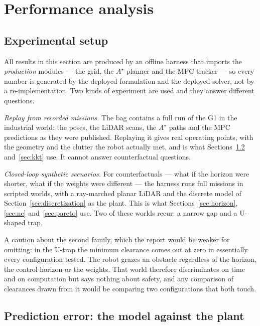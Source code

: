 \documentclass[11pt,a4paper]{article}
\newcommand{\astar}{$A^\star$}
\begin{document}
\section{Performance analysis}
\label{sec:performance}

\subsection{Experimental setup}
\label{sec:setup}

All results in this section are produced by an offline harness that imports the \emph{production} modules ---
the grid, the \astar{} planner and the MPC tracker --- so every number is generated by the deployed
formulation and the deployed solver, not by a re-implementation. Two kinds of experiment are used and they
answer different questions.

\emph{Replay from recorded missions.} The bag \resBag{} contains a full run of the G1 in the industrial world:
the poses, the LiDAR scans, the \astar{} paths and the MPC predictions as they were published. Replaying it
gives real operating points, with the geometry and the clutter the robot actually met, and is what
Sections~\ref{sec:prederr} and~\ref{sec:kkt} use. It cannot answer counterfactual questions.

\emph{Closed-loop synthetic scenarios.} For counterfactuals --- what if the horizon were shorter, what if the
weights were different --- the harness runs full missions in scripted worlds, with a ray-marched planar
LiDAR and the discrete model of Section~\ref{sec:discretization} as the plant. This is what
Sections~\ref{sec:horizon}, \ref{sec:nc} and~\ref{sec:pareto} use. Two of these worlds recur: a narrow gap
and a U-shaped trap.

A caution about the second family, which the report would be weaker for omitting: in the U-trap the minimum
clearance comes out at zero in essentially every configuration tested. The robot grazes an obstacle
regardless of the horizon, the control horizon or the weights. That world therefore discriminates on time and
on computation but says nothing about safety, and any comparison of clearances drawn from it would be
comparing two configurations that both touch.

\subsection{Prediction error: the model against the plant}
\label{sec:prederr}
\end{document}
